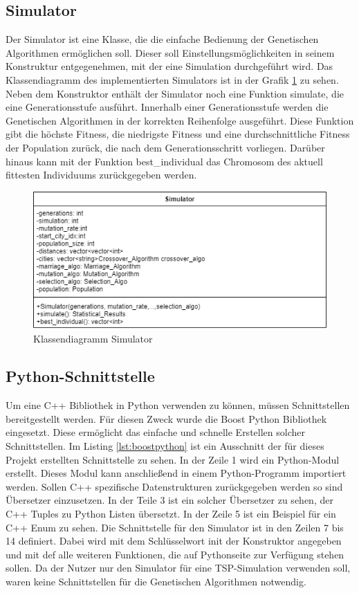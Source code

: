 \subsection{Simulator}
Der Simulator ist eine Klasse, die die einfache Bedienung der Genetischen Algorithmen ermöglichen soll. Dieser soll Einstellungsmöglichkeiten in seinem Konstruktur entgegenehmen, mit der eine Simulation durchgeführt wird. Das Klassendiagramm des implementierten Simulators ist in der Grafik \ref{fig:simulator} zu sehen. Neben dem Konstruktor enthält der Simulator noch eine Funktion simulate, die eine Generationsstufe ausführt. Innerhalb einer Generationsstufe werden die Genetischen Algorithmen in der korrekten Reihenfolge ausgeführt. Diese Funktion gibt die höchste Fitness, die niedrigste Fitness und eine durchschnittliche Fitness der Population zurück, die nach dem Generationsschritt vorliegen. Darüber hinaus kann mit der Funktion best\_individual das Chromosom des aktuell fittesten Individuums zurückgegeben werden.

\begin{figure}[H]
\centering
\includegraphics[width=1\textwidth]{img/Vortrag/simulator.png}
\caption{Klassendiagramm Simulator}
\label{fig:simulator}
\end{figure}

\subsection{Python-Schnittstelle}
Um eine C++ Bibliothek in Python verwenden zu können, müssen Schnittstellen bereitgestellt werden. Für diesen Zweck wurde die Boost Python Bibliothek eingesetzt. Diese ermöglicht das einfache und schnelle Erstellen solcher Schnittstellen. Im Listing \ref{lst:boostpython} ist ein Ausschnitt der für dieses Projekt erstellten Schnittstelle zu sehen. In der Zeile 1 wird ein Python-Modul erstellt. Dieses Modul kann anschließend in einem Python-Programm importiert werden. Sollen C++ spezifische Datenstrukturen zurückgegeben werden so sind Übersetzer einzusetzen. In der Teile 3 ist ein solcher Übersetzer zu sehen, der C++ Tuples zu Python Listen übersetzt. In der Zeile 5 ist ein Beispiel für ein C++ Enum zu sehen. Die Schnittstelle für den Simulator ist in den Zeilen 7 bis 14 definiert. Dabei wird mit dem Schlüsselwort init der Konstruktor angegeben und mit def alle weiteren Funktionen, die auf Pythonseite zur Verfügung stehen sollen. Da der Nutzer nur den Simulator für eine TSP-Simulation verwenden soll, waren keine Schnittstellen für die Genetischen Algorithmen notwendig.

